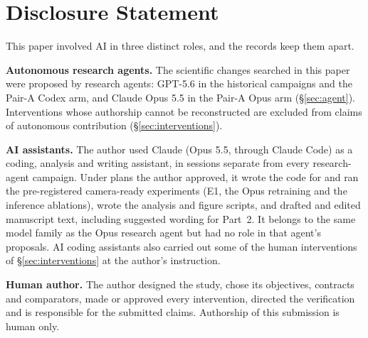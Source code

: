 \documentclass{article}
\newif\ifshowhumanmarkers \showhumanmarkersfalse
\newcommand{\humantag}[1]{{\color{humanframe}\sffamily\scriptsize\bfseries HUMAN AUTHOR MUST REWRITE/VERIFY [#1]}\ }
\newcommand{\humanauthor}[2][]{\ifshowhumanmarkers\begin{humanbox}\humantag{#1}#2\end{humanbox}\else #2\par\fi}
\begin{document}
\section{Disclosure Statement}
\humanauthor[Disclosure r6]{This paper involved AI in three distinct roles, and the records keep them apart.

\textbf{Autonomous research agents.} The scientific changes searched in this paper were proposed by research agents: GPT-5.6 in the historical campaigns and the Pair-A Codex arm, and Claude Opus 5.5 in the Pair-A Opus arm (\S\ref{sec:agent}). Interventions whose authorship cannot be reconstructed are excluded from claims of autonomous contribution (\S\ref{sec:interventions}).

\textbf{AI assistants.} The author used Claude (Opus 5.5, through Claude Code) as a coding, analysis and writing assistant, in sessions separate from every research-agent campaign. Under plans the author approved, it wrote the code for and ran the pre-registered camera-ready experiments (E1, the Opus retraining and the inference ablations), wrote the analysis and figure scripts, and drafted and edited manuscript text, including suggested wording for Part~2. It belongs to the same model family as the Opus research agent but had no role in that agent's proposals. AI coding assistants also carried out some of the human interventions of \S\ref{sec:interventions} at the author's instruction.

\textbf{Human author.} The author designed the study, chose its objectives, contracts and comparators, made or approved every intervention, directed the verification and is responsible for the submitted claims. Authorship of this submission is human only.}

\clearpage


\end{document}
